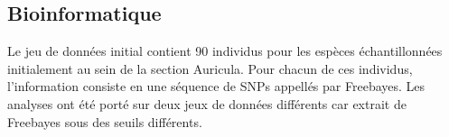 \documentclass[12pt,a4paper,notitlepage]{article}
\begin{document}


\subsection{Bioinformatique}

Le jeu de données initial contient 90 individus pour les espèces échantillonnées initialement au sein de la section Auricula. Pour chacun de ces individus, l'information consiste en une séquence de SNPs appellés par Freebayes. Les analyses ont été porté sur deux jeux de données différents car extrait de Freebayes sous des seuils différents.
\end{document}
